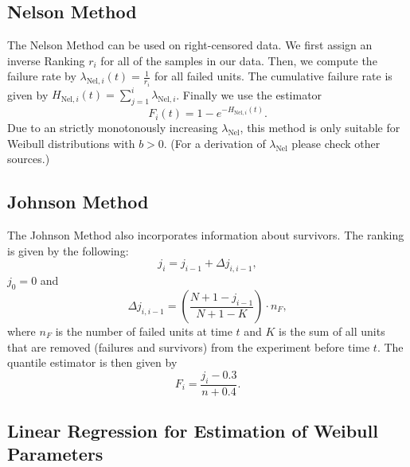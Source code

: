 \subsection{Nelson Method}
The Nelson Method can be used on right-censored data. We first assign an inverse Ranking $r_i$ for all of the samples in our data. Then, we compute the failure rate by $\lambda_{\text{Nel}, i}(t) = \frac{1}{r_i}$ for all failed units. The cumulative failure rate is given by $H_{\text{Nel}, i}(t) = \sum_{j=1}^{i} \lambda_{\text{Nel}, i}$. Finally we use the estimator
$$ F_i(t) = 1 - e^{-H_{\text{Nel}, i}(t)}. $$
Due to an strictly monotonously increasing $\lambda_{\text{Nel}}$, this method is only suitable for Weibull distributions with $b>0$. (For a derivation of $\lambda_{\text{Nel}}$ please check other sources.)

\subsection{Johnson Method}
The Johnson Method also incorporates information about survivors. The ranking is given by the following:
$$ j_i = j_{i-1} + \Delta j_{i,i-1}, $$
$j_0 = 0$ and
$$ \Delta j_{i,i-1} = \left( \frac{N + 1 - j_{i-1}}{N + 1 - K} \right) \cdot n_F, $$
where $n_F$ is the number of failed units at time $t$ and $K$ is the sum of all units that are removed (failures and survivors) from the experiment before time $t$. The quantile estimator is then given by
$$ F_i = \frac{j_i - 0.3}{n + 0.4}. $$

\subsection{Linear Regression for Estimation of Weibull Parameters}
